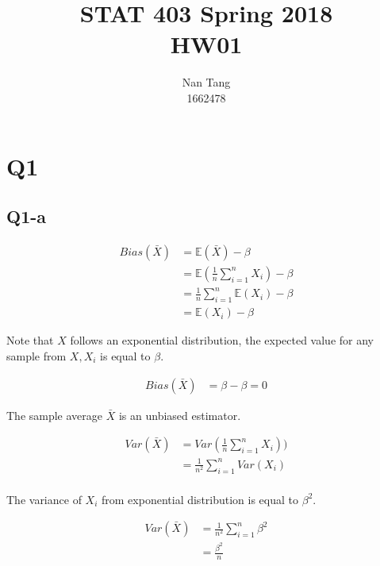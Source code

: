 \documentclass[12pt,letterpaper]{article}
\author{Nan Tang\\1662478}
\title{STAT 403 Spring 2018\\HW01}
\begin{document}
\maketitle

\section*{Q1}

\subsection*{Q1-a}


\begin{align*}
Bias(\bar{X}) &= \mathbb{E}(\bar{X}) - \beta \\
&= \mathbb{E}(\frac{1}{n} \sum_{i=1}^{n}X_i) - \beta\\
&= \frac{1}{n} \sum_{i=1}^{n} \mathbb{E}(X_i) - \beta \\
&= \mathbb{E}(X_i) - \beta
\end{align*}

\noindent Note that $X$ follows an exponential distribution, the expected value for any sample from $X, X_i$ is equal to $\beta$.

\begin{align*}
Bias(\bar{X}) &= \beta - \beta = 0
\end{align*}

\noindent The sample average $\bar{X}$ is an unbiased estimator.

\begin{align*}
Var(\bar{X}) &= Var(\frac{1}{n} \sum_{i=1}^{n}X_i)) \\
&= \frac{1}{n^2} \sum_{i=1}^{n} Var(X_i) \\
\end{align*}

\noindent The variance of $X_i$ from exponential distribution is equal to $\beta^2$.

\begin{align*}
Var(\bar{X}) &= \frac{1}{n^2} \sum_{i=1}^{n} \beta^2 \\
&= \frac{\beta^2}{n}
\end{align*}
\end{document}
